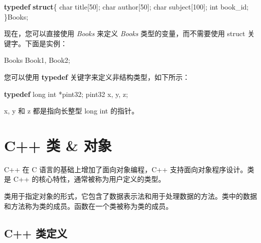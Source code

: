 \documentclass[
]{article}
\newenvironment{Shaded}{}{}
\newcommand{\DataTypeTok}[1]{\textcolor[rgb]{0.56,0.13,0.00}{#1}}
\newcommand{\DecValTok}[1]{\textcolor[rgb]{0.25,0.63,0.44}{#1}}
\newcommand{\KeywordTok}[1]{\textcolor[rgb]{0.00,0.44,0.13}{\textbf{#1}}}
\newcommand{\NormalTok}[1]{#1}
\newcommand{\OperatorTok}[1]{\textcolor[rgb]{0.40,0.40,0.40}{#1}}
\begin{document}
\begin{Shaded}
\begin{Highlighting}[]
\KeywordTok{typedef} \KeywordTok{struct}\OperatorTok{\{}
   \DataTypeTok{char}\NormalTok{  title}\OperatorTok{[}\DecValTok{50}\OperatorTok{];}
   \DataTypeTok{char}\NormalTok{  author}\OperatorTok{[}\DecValTok{50}\OperatorTok{];}
   \DataTypeTok{char}\NormalTok{  subject}\OperatorTok{[}\DecValTok{100}\OperatorTok{];}
   \DataTypeTok{int}\NormalTok{   book\_id}\OperatorTok{;}
\OperatorTok{\}}\NormalTok{Books}\OperatorTok{;}
\end{Highlighting}
\end{Shaded}

现在，您可以直接使用 \emph{Books} 来定义 \emph{Books}
类型的变量，而不需要使用 struct 关键字。下面是实例：

\begin{Shaded}
\begin{Highlighting}[]
\NormalTok{Books Book1}\OperatorTok{,}\NormalTok{ Book2}\OperatorTok{;}
\end{Highlighting}
\end{Shaded}

您可以使用 \textbf{typedef} 关键字来定义非结构类型，如下所示：

\begin{Shaded}
\begin{Highlighting}[]
\KeywordTok{typedef} \DataTypeTok{long} \DataTypeTok{int} \OperatorTok{*}\NormalTok{pint32}\OperatorTok{;}
\NormalTok{pint32 x}\OperatorTok{,}\NormalTok{ y}\OperatorTok{,}\NormalTok{ z}\OperatorTok{;}
\end{Highlighting}
\end{Shaded}

x, y 和 z 都是指向长整型 long int 的指针。

\hypertarget{c-ux7c7b-ux5bf9ux8c61}{%
\section{C++ 类 \& 对象}\label{c-ux7c7b-ux5bf9ux8c61}}

C++ 在 C 语言的基础上增加了面向对象编程，C++ 支持面向对象程序设计。类是
C++ 的核心特性，通常被称为用户定义的类型。

类用于指定对象的形式，它包含了数据表示法和用于处理数据的方法。类中的数据和方法称为类的成员。函数在一个类被称为类的成员。

\hypertarget{c-ux7c7bux5b9aux4e49}{%
\subsection{C++ 类定义}\label{c-ux7c7bux5b9aux4e49}}
\end{document}
